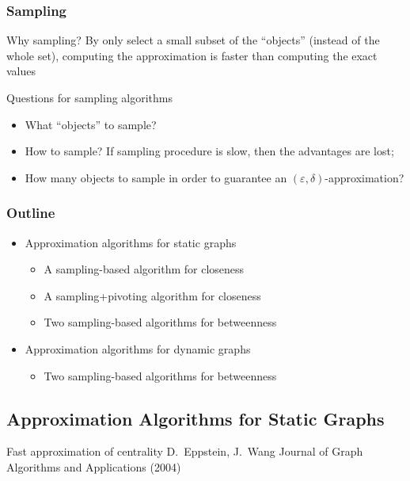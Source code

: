 \begin{frame}
  \frametitle{Sampling}
  \begin{block}{Why sampling?}
    By only select a small subset of the ``objects'' (instead of the whole set),
    computing the approximation is faster than computing the exact values
  \end{block}
  \pause
  \begin{block}{Questions for sampling algorithms}
    \begin{itemize}
      \item What ``objects'' to sample?
        \pause
      \item How to sample? If sampling procedure is slow, then the advantages
        are lost;
        \pause
      \item How many objects to sample in order to guarantee an
        $(\varepsilon,\delta)$-approximation?
    \end{itemize}
  \end{block}
\end{frame}

\begin{frame}
  \frametitle{Outline}
  \begin{itemize}
    \item Approximation algorithms for static graphs
      \begin{itemize}
        \item A sampling-based algorithm for closeness
        \item A sampling+pivoting algorithm for closeness
        \item Two sampling-based algorithms for betweenness
      \end{itemize}
    \item Approximation algorithms for dynamic graphs
      \begin{itemize}
        \item Two sampling-based algorithms for betweenness
      \end{itemize}
  \end{itemize}
\end{frame}

\subsection{Approximation Algorithms for Static Graphs}

\begin{frame}
  \centering
  \vfill
  {\huge Fast approximation of centrality}
  \vfill
  {\Large D.~Eppstein, J.~Wang}
  \vfill
  {\large Journal of Graph Algorithms and Applications (2004)}
  \vfill
\end{frame}

